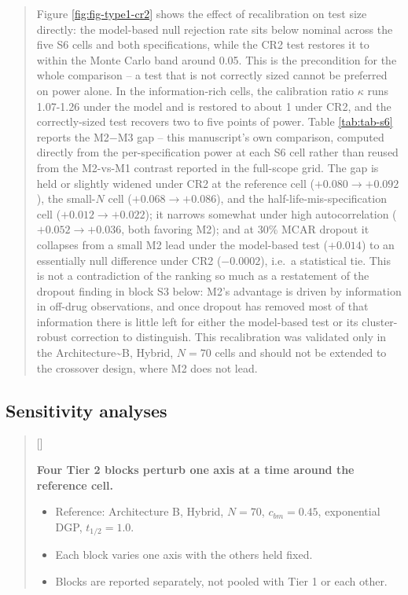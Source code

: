 \documentclass[
  11pt,
]{article}
\newcounter{pgraph}
\newenvironment{bullets}{%
  \stepcounter{pgraph}%
  \begin{quote}\small\sffamily\color[gray]{0.30}%
  {\normalfont\scriptsize\color[gray]{0.58}[\thepgraph]\enspace}}{%
  \end{quote}}
\newenvironment{orig}{%
  \begin{quote}\normalsize\color[gray]{0.55}}{%
  \end{quote}}
\begin{document}
\begin{orig}
Figure \ref{fig:fig-type1-cr2} shows the effect of recalibration on
test size directly: the model-based null rejection rate sits below
nominal across the five S6 cells and both specifications, while the
CR2 test restores it to within the Monte Carlo band around 0.05. This
is the precondition for the whole comparison -- a test that is not
correctly sized cannot be preferred on power alone. In the
information-rich cells, the calibration ratio \(\kappa\) runs 1.07-1.26
under the model and is restored to about 1 under CR2, and the
correctly-sized test recovers two to five points of power. Table
\ref{tab:tab-s6} reports the M2\(-\)M3 gap -- this manuscript's own
comparison, computed directly from the per-specification power at
each S6 cell rather than reused from the M2-vs-M1 contrast reported
in the full-scope grid. The gap is held or slightly widened under CR2
at the reference cell (\(+0.080 \to +0.092\)), the small-\(N\) cell
(\(+0.068 \to +0.086\)), and the half-life-mis-specification cell
(\(+0.012 \to +0.022\)); it narrows somewhat under high autocorrelation
(\(+0.052 \to +0.036\), both favoring M2); and at 30\% MCAR dropout it
collapses from a small M2 lead under the model-based test (\(+0.014\))
to an essentially null difference under CR2 (\(-0.0002\)), i.e.~a
statistical tie. This is not a contradiction of the ranking so much
as a restatement of the dropout finding in block S3 below: M2's
advantage is driven by information in off-drug observations, and
once dropout has removed most of that information there is little
left for either the model-based test or its cluster-robust correction
to distinguish. This recalibration was validated only in the
Architecture\textasciitilde B, Hybrid, \(N = 70\) cells and should not be extended to
the crossover design, where M2 does not lead.

\end{orig}

\subsection{Sensitivity analyses}\label{sensitivity-analyses}

\begin{bullets}

\textbf{Four Tier 2 blocks perturb one axis at a time around the
reference cell.}

\begin{itemize}\setlength{\itemsep}{2pt}\setlength{\parskip}{0pt}
\item Reference: Architecture B, Hybrid, $N = 70$, $c_{bm} = 0.45$,
exponential DGP, $t_{1/2} = 1.0$.
\item Each block varies one axis with the others held fixed.
\item Blocks are reported separately, not pooled with Tier 1 or each
other.
\end{itemize}

\end{bullets}
\end{document}
